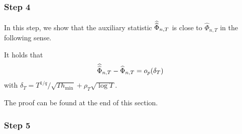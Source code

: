 \documentclass[12pt]{article}
\begin{document}
\subsubsection*{Step 4}


In this step, we show that the auxiliary statistic $\widehat{\widehat{\Phi}}_{n,T}$ is close to $\widehat{\Phi}_{n,T}$ in the following sense.
\begin{propA}\label{propA:step4}
It holds that 
\[ \widehat{\widehat{\Phi}}_{n,T} - \widehat{\Phi}_{n,T} = o_p(\delta_T) \]
with $\delta_T = T^{1/q}/\sqrt{T h_{\min}} + \rho_T \sqrt{\log T}$.
\end{propA}
The proof can be found at the end of this section. 


\subsubsection*{Step 5} 
\end{document}
